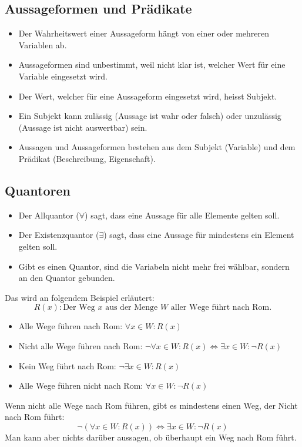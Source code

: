 \subsection{Aussageformen und Prädikate}
  \begin{itemize}
    \item Der Wahrheitswert einer Aussageform hängt von einer oder mehreren Variablen ab.
    \item Aussageformen sind unbestimmt, weil nicht klar ist, welcher Wert
      für eine Variable eingesetzt wird.
    \item Der Wert, welcher für eine Aussageform eingesetzt wird, heisst Subjekt.
    \item Ein Subjekt kann zulässig (Aussage ist wahr oder falsch) oder unzulässig
      (Aussage ist nicht auswertbar) sein.
    \item Aussagen und Aussageformen bestehen aus dem Subjekt (Variable)
      und dem Prädikat (Beschreibung, Eigenschaft).
  \end{itemize}

\subsection{Quantoren}
  \begin{itemize}
    \item Der Allquantor ($\forall$) sagt, dass eine Aussage für alle
      Elemente gelten soll.
    \item Der Existenzquantor ($\exists$) sagt, dass eine Aussage für
      mindestens ein Element gelten soll.
    \item Gibt es einen Quantor, sind die Variabeln nicht mehr frei wählbar,
      sondern an den Quantor gebunden.
  \end{itemize}
  Das wird an folgendem Beispiel erläutert:
  \[R(x) : \text{Der Weg } x \text{ aus der Menge } W \text{ aller Wege führt nach Rom.} \]
  \begin{itemize}
    \item Alle Wege führen nach Rom: $\forall x \in W: R(x)$
    \item Nicht alle Wege führen nach Rom: $\neg \forall x \in W: R(x)
    \Leftrightarrow \exists x \in W: \neg R(x)$
    \item Kein Weg führt nach Rom: $\neg \exists x \in W: R(x)$
    \item Alle Wege führen nicht nach Rom: $\forall x \in W: \neg R(x)$
  \end{itemize}
  Wenn nicht alle Wege nach Rom führen, gibt es mindestens einen Weg,
    der Nicht nach Rom führt:
  \[ \neg (\forall x \in W: R(x)) \Leftrightarrow \exists x \in W: \neg R(x) \]
  Man kann aber nichts darüber aussagen, ob überhaupt ein Weg nach Rom führt.

